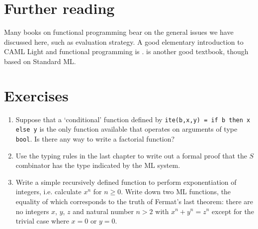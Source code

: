 \section*{Further reading}

Many books on functional programming bear on the general issues we have
discussed here, such as evaluation strategy. A good elementary introduction to
CAML Light and functional programming is .
 is another good textbook, though based on Standard ML.

\section*{Exercises}

\begin{enumerate}

\item Suppose that a `conditional' function defined by {\tt ite(b,x,y) = if b
then x else y} is the only function available that operates on arguments of
type {\tt bool}. Is there any way to write a factorial function?

\item Use the typing rules in the last chapter to write out a formal proof that
the $S$ combinator has the type indicated by the ML system.

\item Write a simple recursively defined function to perform exponentiation of
integers, i.e. calculate $x^n$ for $n \geq 0$. Write down two ML functions, the
equality of which corresponds to the truth of Fermat's last theorem: there are
no integers $x$, $y$, $z$ and natural number $n > 2$ with $x^n + y^n = z^n$
except for the trivial case where $x = 0$ or $y = 0$.

\end{enumerate}

